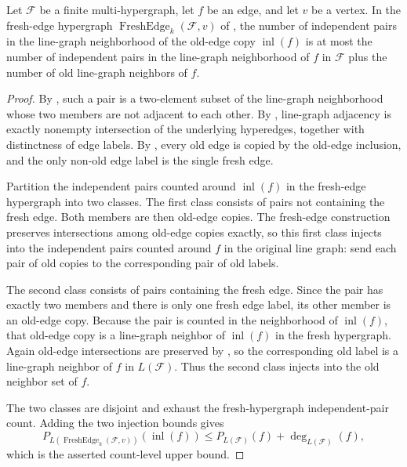 \begin{helper}
Let $\mathcal F$ be a finite multi-hypergraph, let $f$ be an edge, and let
$v$ be a vertex.  In the fresh-edge hypergraph
$\operatorname{FreshEdge}_k(\mathcal F,v)$ of
, the number of independent pairs in the
line-graph neighborhood of the old-edge copy $\operatorname{inl}(f)$ is at most
the number of independent pairs in the line-graph neighborhood of $f$ in
$\mathcal F$ plus the number of old line-graph neighbors of $f$.
\end{helper}
\begin{proof}
By , such a pair is a two-element subset of the
line-graph neighborhood whose two members are not adjacent to each other.  By
, line-graph adjacency is exactly nonempty
intersection of the underlying hyperedges, together with distinctness of edge
labels.  By , every old edge is copied by
the old-edge inclusion, and the only non-old edge label is the single fresh
edge.

Partition the independent pairs counted around $\operatorname{inl}(f)$ in the
fresh-edge hypergraph into two classes.  The first class consists of pairs not
containing the fresh edge.  Both members are then old-edge copies.  The
fresh-edge construction preserves intersections among old-edge copies exactly,
so this first class injects into the independent pairs counted around $f$ in
the original line graph: send each pair of old copies to the corresponding pair
of old labels.

The second class consists of pairs containing the fresh edge.  Since the pair
has exactly two members and there is only one fresh edge label, its other
member is an old-edge copy.  Because the pair is counted in the neighborhood of
$\operatorname{inl}(f)$, that old-edge copy is a line-graph neighbor of
$\operatorname{inl}(f)$ in the fresh hypergraph.  Again old-edge intersections
are preserved by , so the corresponding
old label is a line-graph neighbor of $f$ in $L(\mathcal F)$.  Thus the second
class injects into the old neighbor set of $f$.

The two classes are disjoint and exhaust the fresh-hypergraph independent-pair
count.  Adding the two injection bounds gives
\[
  P_{L(\operatorname{FreshEdge}_k(\mathcal F,v))}(\operatorname{inl}(f))
  \le P_{L(\mathcal F)}(f)+\deg_{L(\mathcal F)}(f),
\]
which is the asserted count-level upper bound.
\end{proof}
